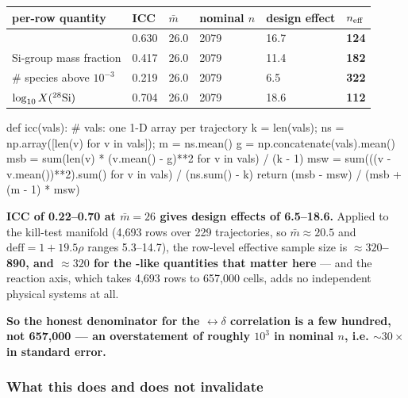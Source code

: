 \begin{center}
\begin{tabularx}{\textwidth}{@{}Y L{1.3cm} L{1.1cm} L{1.7cm} L{2.0cm} L{1.5cm}@{}}
\toprule
\textbf{per-row quantity} & \textbf{ICC} & \textbf{$\bar m$} &
\textbf{nominal $n$} & \textbf{design effect} & \textbf{$n_{\rm eff}$} \\
\midrule
\Ye{} & 0.630 & 26.0 & 2079 & 16.7 & \textbf{124} \\
Si-group mass fraction & 0.417 & 26.0 & 2079 & 11.4 & \textbf{182} \\
\# species above $10^{-3}$ & 0.219 & 26.0 & 2079 & 6.5 & \textbf{322} \\
$\log_{10} X(\nuc{Si}{28})$ & 0.704 & 26.0 & 2079 & 18.6 & \textbf{112} \\
\bottomrule
\end{tabularx}
\end{center}

\begin{srclisting}
def icc(vals):                      # vals: one 1-D array per trajectory
    k = len(vals); ns = np.array([len(v) for v in vals]); m = ns.mean()
    g = np.concatenate(vals).mean()
    msb = sum(len(v) * (v.mean() - g)**2 for v in vals) / (k - 1)
    msw = sum(((v - v.mean())**2).sum() for v in vals) / (ns.sum() - k)
    return (msb - msw) / (msb + (m - 1) * msw)
\end{srclisting}

\textbf{ICC of 0.22--0.70 at $\bar m = 26$ gives design effects of 6.5--18.6.}
Applied to the kill-test manifold (4,693 rows over 229 trajectories, so
$\bar m \approx 20.5$ and $\text{deff} = 1 + 19.5\rho$ ranges 5.3--14.7), the
row-level effective sample size is \textbf{$\approx 320$--890, and
$\approx 320$ for the \Ye-like quantities that matter here} --- and the reaction
axis, which takes 4,693 rows to 657,000 cells, adds no independent physical
systems at all.

\begin{result}
\textbf{So the honest denominator for the \kap$\leftrightarrow\delta$
correlation is a few hundred, not 657,000 --- an overstatement of roughly
$10^{3}$ in nominal $n$, i.e. ${\sim}30\times$ in standard error.}
\end{result}

\subsubsection{What this does and does not invalidate}
\label{sec:clusterrobust-scope}

